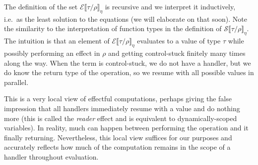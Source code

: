 \documentclass[a4paper, 11pt,titlepage, openright, twoside]{report}
\newcommand{\E}{\mathcal{E}}
\renewcommand{\S}{\mathcal{S}}
\newcommand{\+}{\enspace}
\begin{document}
The definition of the set $\E⟦τ/ρ⟧_η$ is recursive and we interpret it inductively,
i.e.\ as the least solution to the equations (we will elaborate on that soon).
Note the similarity to the interpretation of function types in the definition of
$\S⟦τ/ρ⟧_η$.
The intuition is that an element of $\E⟦τ/ρ⟧_η$
evaluates to a value of type $τ$ while possibly performing an effect in $ρ$ and
getting control-stuck
finitely many times along the way.
When the term is control-stuck, we do not have a handler,
but we do know the return type of the operation,
so we resume with all possible values in parallel.

This is a very local view of effectful computations,
perhaps giving the false impression that all handlers immediately resume with a value and
do nothing more (this is called the {\em reader} effect and is equivalent to dynamically-scoped variables).
In reality, much can happen between
performing the operation and it finally returning.
Nevertheless, this local view suffices for our purposes and
accurately reflects how much of the computation remains in the scope of a handler
throughout evaluation.
\end{document}
